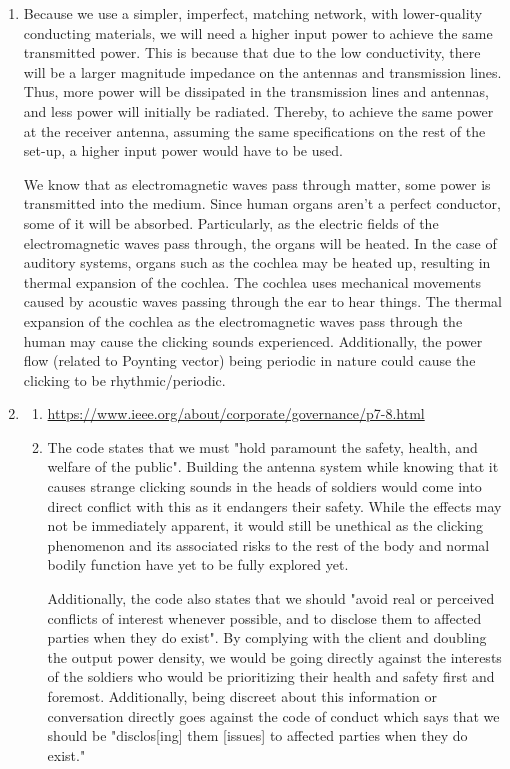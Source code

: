 \documentclass[12pt]{article}
\begin{document}
\begin{enumerate}
\begin{enumerate}
		\item [(b)]
		Because we use a simpler, imperfect, matching network, with lower-quality conducting materials, we will need a higher input power to achieve the same transmitted power.
		This is because that due to the low conductivity, there will be a larger magnitude impedance on the antennas and transmission lines.
		Thus, more power will be dissipated in the transmission lines and antennas, and less power will initially be radiated.
		Thereby, to achieve the same power at the receiver antenna, assuming the same specifications on the rest of the set-up, a higher input power would have to be used.

		We know that as electromagnetic waves pass through matter, some power is transmitted into the medium.
		Since human organs aren't a perfect conductor, some of it will be absorbed.
		Particularly, as the electric fields of the electromagnetic waves pass through, the organs will be heated.
		In the case of auditory systems, organs such as the cochlea may be heated up, resulting in thermal expansion of the cochlea.
		The cochlea uses mechanical movements caused by acoustic waves passing through the ear to hear things.
		The thermal expansion of the cochlea as the electromagnetic waves pass through the human may cause the clicking sounds experienced.
		Additionally, the power flow (related to Poynting vector) being periodic in nature could cause the clicking to be rhythmic/periodic. 

		\item [(c)]
		\begin{enumerate}
			\item [(i)]
			\url{https://www.ieee.org/about/corporate/governance/p7-8.html}

			\item [(ii)]
			The code states that we must "hold paramount the safety, health, and welfare of the public".
			Building the antenna system while knowing that it causes strange clicking sounds in the heads of soldiers would come into direct conflict with this as it endangers their safety.
			While the effects may not be immediately apparent, it would still be unethical as the clicking phenomenon and its associated risks to the rest of the body and normal bodily function have yet to be fully explored yet.

			Additionally, the code also states that we should "avoid real or perceived conflicts of interest whenever possible, and to disclose them to affected parties when they do exist".
			By complying with the client and doubling the output power density, we would be going directly against the interests of the soldiers who would be prioritizing their health and safety first and foremost.
			Additionally, being discreet about this information or conversation directly goes against the code of conduct which says that we should be "disclos[ing] them [issues] to affected parties when they do exist."


\end{enumerate}
\end{enumerate}
\end{enumerate}
\end{document}
